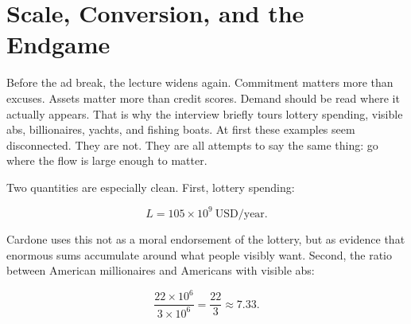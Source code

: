\begin{figure}[h]
\centering
{}
\end{figure}

\section{Scale, Conversion, and the Endgame}

Before the ad break, the lecture widens again. Commitment matters more than excuses. Assets matter more than credit scores. Demand should be read where it actually appears. That is why the interview briefly tours lottery spending, visible abs, billionaires, yachts, and fishing boats. At first these examples seem disconnected. They are not. They are all attempts to say the same thing: go where the flow is large enough to matter.

Two quantities are especially clean. First, lottery spending:

\begin{equation}
L = 105\times 10^9\ \text{USD/year}.
\end{equation}

Cardone uses this not as a moral endorsement of the lottery, but as evidence that enormous sums accumulate around what people visibly want. Second, the ratio between American millionaires and Americans with visible abs:

\begin{equation}
\frac{22\times 10^6}{3\times 10^6}=\frac{22}{3}\approx 7.33.
\end{equation}

